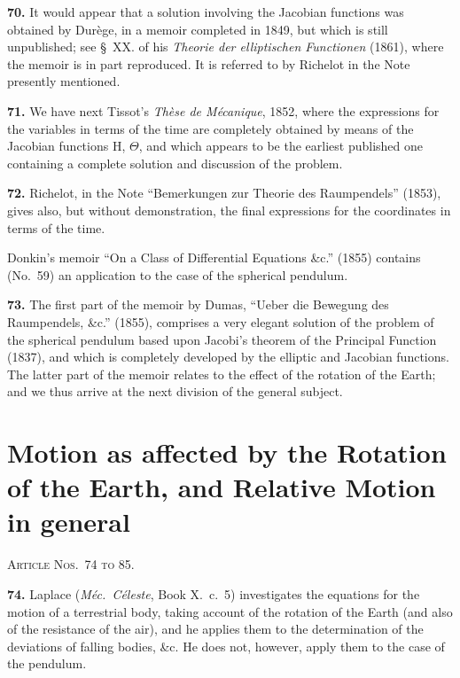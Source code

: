 \documentclass[11pt,a4paper]{book}
\begin{document}

\textbf{70.} It would appear that a solution involving the Jacobian functions was obtained by Dur\`ege, in a memoir completed in 1849, but which is still unpublished; see \S~XX. of his \textit{Theorie der elliptischen Functionen} (1861), where the memoir is in part reproduced. It is referred to by Richelot in the Note presently mentioned.

\textbf{71.} We have next Tissot's \textit{Th\`ese de M\'ecanique}, 1852, where the expressions for the variables in terms of the time are completely obtained by means of the Jacobian functions H, $\Theta$, and which appears to be the earliest published one containing a complete solution and discussion of the problem.

\textbf{72.} Richelot, in the Note ``Bemerkungen zur Theorie des Raumpendels'' (1853), gives also, but without demonstration, the final expressions for the coordinates in terms of the time.

Donkin's memoir ``On a Class of Differential Equations \&c.'' (1855) contains (No.~59) an application to the case of the spherical pendulum.

\textbf{73.} The first part of the memoir by Dumas, ``Ueber die Bewegung des Raumpendels, \&c.'' (1855), comprises a very elegant solution of the problem of the spherical pendulum based upon Jacobi's theorem of the Principal Function (1837), and which is completely developed by the elliptic and Jacobian functions. The latter part of the memoir relates to the effect of the rotation of the Earth; and we thus arrive at the next division of the general subject.


\section*{Motion as affected by the Rotation of the Earth, and Relative Motion in general}
\noindent\textsc{Article Nos.~74 to 85.}

\medskip

\textbf{74.} Laplace (\textit{M\'ec.\ C\'eleste}, Book X.~c.~5) investigates the equations for the motion of a terrestrial body, taking account of the rotation of the Earth (and also of the resistance of the air), and he applies them to the determination of the deviations of falling bodies, \&c. He does not, however, apply them to the case of the pendulum.
\end{document}

